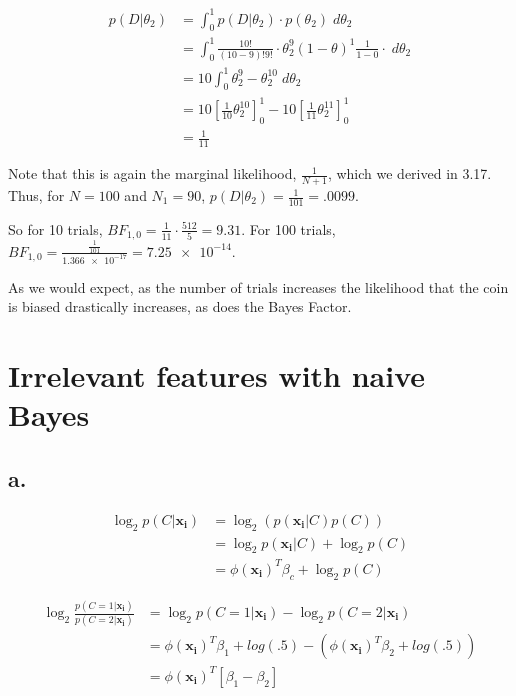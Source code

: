 \documentclass{article}
\begin{document}
\begin{align*}
  p(D|\theta_2) &= \int_0^1 p(D|\theta_2) \cdot p(\theta_2) \;
                  d\theta_2 \\
                &= \int_0^1 \frac{10!}{(10-9)!9!} \cdot \theta_2^9 (1
                  - \theta)^1 \frac{1}{1 - 0}\cdot \; d\theta_2 \\
                &= 10 \int_0^1 \theta_2^9 - \theta_2^{10} \; d\theta_2 \\
                &= 10 \left[\frac{1}{10} \theta_2^{10} \right]_0^1 -
                  10 \left[\frac{1}{11} \theta_2^{11} \right]_0^1 \\
                &= \frac{1}{11}
\end{align*}

Note that this is again the marginal likelihood, $\frac{1}{N+1}$, which we derived in
3.17. Thus, for $N = 100$ and $N_1 = 90$, $p(D|\theta_2) =
\frac{1}{101} = .0099$.

So for 10 trials, $BF_{1,0} = \frac{1}{11} \cdot \frac{512}{5} = 9.31$.
For 100 trials, $BF_{1,0} = \frac{\frac{1}{101}}{\num{1.366e-17}} = \num{7.25e-14}$.

As we would expect, as the number of trials increases the likelihood
that the coin is biased drastically increases, as does the Bayes
Factor.

\section{Irrelevant features with naive Bayes}

\subsection{a.}

\begin{align*}
  \log_2 p(C|\mathbf{x_i}) &= \log_2 \left( p(\mathbf{x_i}|C) p(C) \right) \\
                        &= \log_2 p(\mathbf{x_i}|C) + \log_2 p(C) \\
                        &= \phi(\mathbf{x_i})^T \beta_c + \log_2 p(C)
\end{align*}

\begin{align*}
  \log_2 \frac{p(C=1|\mathbf{x_i})}{p(C=2|\mathbf{x_i})} &= \log_2 p(C=1|\mathbf{x_i}) - \log_2 p(C=2|\mathbf{x_i}) \\
      &= \phi(\mathbf{x_i})^T \beta_1 + log(.5) - (\phi(\mathbf{x_i})^T \beta_2 + log(.5)) \\
      &= \phi(\mathbf{x_i})^T \left[ \beta_1  - \beta_2 \right]
\end{align*}
\end{document}
